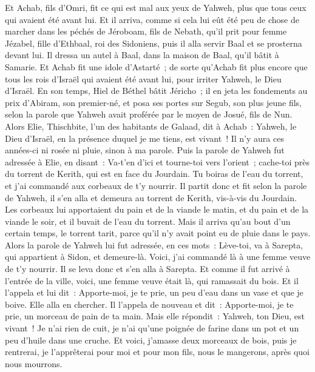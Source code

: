 \begin{multicols}{2}
Et Achab, fils d'Omri, fit ce qui est mal aux yeux de Yahweh, plus que tous ceux qui avaient été avant lui.
Et il arriva, comme si cela lui eût été peu de chose de marcher dans les péchés de Jéroboam, fils de Nebath, qu'il prit pour femme Jézabel, fille d'Ethbaal, roi des Sidoniens, puis il alla servir Baal et se prosterna devant lui.
Il dressa un autel à Baal, dans la maison de Baal, qu'il bâtit à Samarie.
Et Achab fit une idole d'Astarté~; de sorte qu'Achab fit plus encore que tous les rois d'Israël qui avaient été avant lui, pour irriter Yahweh, le Dieu d'Israël.
En son temps, Hiel de Béthel bâtit Jéricho~; il en jeta les fondements au prix d'Abiram, son premier-né, et posa ses portes sur Segub, son plus jeune fils, selon la parole que Yahweh avait proférée par le moyen de Josué, fils de Nun.
\VerseOne{}Alors Elie, Thischbite, l'un des habitants de Galaad, dit à Achab~: Yahweh, le Dieu d'Israël, en la présence duquel je me tiens, est vivant~! Il n'y aura ces années-ci ni rosée ni pluie, sinon à ma parole.
Puis la parole de Yahweh fut adressée à Elie, en disant~:
Va-t'en d'ici et tourne-toi vers l'orient~; cache-toi près du torrent de Kerith, qui est en face du Jourdain.
Tu boiras de l'eau du torrent, et j'ai commandé aux corbeaux de t'y nourrir.
Il partit donc et fit selon la parole de Yahweh, il s'en alla et demeura au torrent de Kerith, vis-à-vis du Jourdain.
Les corbeaux lui apportaient du pain et de la viande le matin, et du pain et de la viande le soir, et il buvait de l'eau du torrent.
Mais il arriva qu'au bout d'un certain temps, le torrent tarit, parce qu'il n'y avait point eu de pluie dans le pays.
Alors la parole de Yahweh lui fut adressée, en ces mots~:
Lève-toi, va à Sarepta, qui appartient à Sidon, et demeure-là. Voici, j'ai commandé là à une femme veuve de t'y nourrir.
Il se leva donc et s'en alla à Sarepta. Et comme il fut arrivé à l'entrée de la ville, voici, une femme veuve était là, qui ramassait du bois. Et il l'appela et lui dit~: Apporte-moi, je te prie, un peu d'eau dans un vase et que je boive.
Elle alla en chercher. Il l'appela de nouveau et dit~: Apporte-moi, je te prie, un morceau de pain de ta main.
Mais elle répondit~: Yahweh, ton Dieu, est vivant~! Je n'ai rien de cuit, je n'ai qu'une poignée de farine dans un pot et un peu d'huile dans une cruche. Et voici, j'amasse deux morceaux de bois, puis je rentrerai, je l'apprêterai pour moi et pour mon fils, nous le mangerons, après quoi nous mourrons.

\end{multicols}
